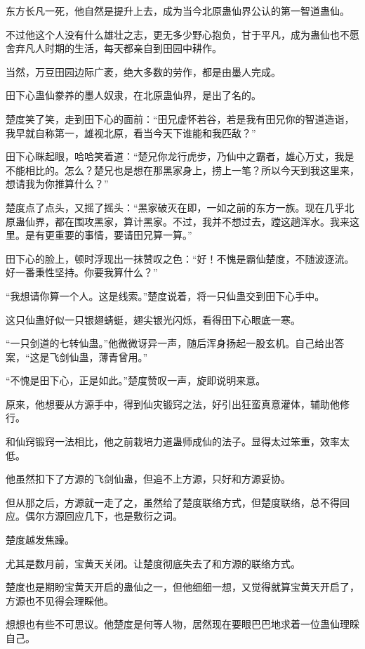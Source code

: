 \begin{this_body}
东方长凡一死，他自然是提升上去，成为当今北原蛊仙界公认的第一智道蛊仙。

不过他这个人没有什么雄壮之志，更无多少野心抱负，甘于平凡，成为蛊仙也不愿舍弃凡人时期的生活，每天都亲自到田园中耕作。

当然，万豆田园边际广袤，绝大多数的劳作，都是由墨人完成。

田下心蛊仙豢养的墨人奴隶，在北原蛊仙界，是出了名的。

楚度笑了笑，走到田下心的面前：“田兄虚怀若谷，若是我有田兄你的智道造诣，我早就自称第一，雄视北原，看当今天下谁能和我匹敌？”

田下心眯起眼，哈哈笑着道：“楚兄你龙行虎步，乃仙中之霸者，雄心万丈，我是不能相比的。怎么？楚兄也是想在那黑家身上，捞上一笔？所以今天到我这里来，想请我为你推算什么？”

楚度点了点头，又摇了摇头：“黑家破灭在即，一如之前的东方一族。现在几乎北原蛊仙界，都在围攻黑家，算计黑家。不过，我并不想过去，蹚这趟浑水。我来这里。是有更重要的事情，要请田兄算一算。”

田下心的脸上，顿时浮现出一抹赞叹之色：“好！不愧是霸仙楚度，不随波逐流。好一番秉性坚持。你要我算什么？”

“我想请你算一个人。这是线索。”楚度说着，将一只仙蛊交到田下心手中。

这只仙蛊好似一只银翅蜻蜓，翅尖银光闪烁，看得田下心眼底一寒。

“一只剑道的七转仙蛊。”他微微讶异一声，随后浑身扬起一股玄机。自己给出答案，“这是飞剑仙蛊，薄青曾用。”

“不愧是田下心，正是如此。”楚度赞叹一声，旋即说明来意。

原来，他想要从方源手中，得到仙灾锻窍之法，好引出狂蛮真意灌体，辅助他修行。

和仙窍锻窍一法相比，他之前栽培力道蛊师成仙的法子。显得太过笨重，效率太低。

他虽然扣下了方源的飞剑仙蛊，但追不上方源，只好和方源妥协。

但从那之后，方源就一走了之，虽然给了楚度联络方式，但楚度联络，总不得回应。偶尔方源回应几下，也是敷衍之词。

楚度越发焦躁。

尤其是数月前，宝黄天关闭。让楚度彻底失去了和方源的联络方式。

楚度也是期盼宝黄天开启的蛊仙之一，但他细细一想，又觉得就算宝黄天开启了，方源也不见得会理睬他。

想想也有些不可思议。他楚度是何等人物，居然现在要眼巴巴地求着一位蛊仙理睬自己。


\end{this_body}
